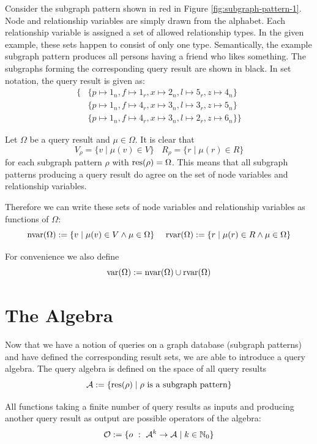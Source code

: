 Consider the subgraph pattern shown in red in Figure
\ref{fig:subgraph-pattern-1}.
Node and relationship variables are simply drawn from the alphabet.
Each relationship variable is assigned a set of allowed relationship types.
In the given example, these sets happen to consist of only one type.
Semantically, the example subgraph pattern produces all persons having a
friend who likes something. The subgraphs forming the corresponding query
result are shown in black. In set notation, the query result is given as:
\begin{align*}
  \{
    &\{ p \mapsto 1_n, f \mapsto 1_r, x \mapsto 2_n, l \mapsto 5_r, z \mapsto 4_n \} \\
    &\{ p \mapsto 1_n, f \mapsto 4_r, x \mapsto 3_n, l \mapsto 3_r, z \mapsto 5_n \} \\
    &\{ p \mapsto 1_n, f \mapsto 4_r, x \mapsto 3_n, l \mapsto 2_r, z \mapsto 6_n \}
  \}
\end{align*}

Let $\Omega$ be a query result and $\mu \in \Omega$. It is clear that
\[
  V_\rho = \{ v \mid \mu(v) \in V \}
    ~~~~
  R_\rho = \{ r \mid \mu(r) \in R \}
\]
for each subgraph pattern $\rho$ with $\text{res}(\rho) = \Omega$.
This means that all subgraph patterns producing a query result do agree on
the set of node variables and relationship variables.

Therefore we can write these sets of node variables and relationship variables
as functions of $\Omega$:
\[
  \textnormal{nvar}(\Omega) := \{ v \mid \mu(v) \in V \land \mu \in \Omega \}
    ~~~~
  \textnormal{rvar}(\Omega) := \{ r \mid \mu(r) \in R \land \mu \in \Omega \}
\]

For convenience we also define
\[
  \textnormal{var}(\Omega) := \textnormal{nvar}(\Omega) \cup \textnormal{rvar}(\Omega)
\]

\section{The Algebra}
\label{sec:query-algebra}

Now that we have a notion of queries on a graph database (subgraph patterns)
and have defined the corresponding result sets, we are able to introduce a
query algebra.
The query algebra is defined on the space of all query results
\[
  \mathcal{A} := \{ \text{res}(\rho) \mid \rho \text{ is a subgraph pattern} \}
\]

All functions taking a finite number of query results as inputs and producing
another query result as output are possible operators of the algebra:
\[
 \mathcal{O} := \{ o ~:~ \mathcal{A}^k \rightarrow \mathcal{A} \mid k \in \mathbb{N}_0 \}
\]

